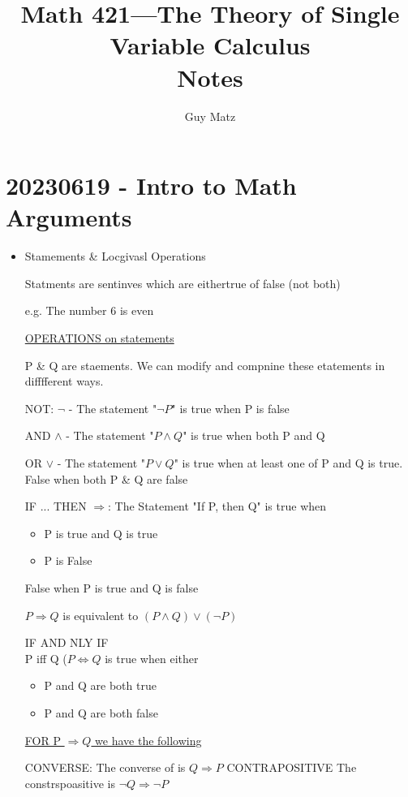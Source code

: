 \documentclass{report}
\title{
  \Huge{Math 421---The Theory of Single Variable Calculus}
  \\
  Notes
}
\author{\huge{Guy Matz}}
\date{}
\begin{document}
\section*{20230619 - Intro to Math Arguments}%
  \begin{itemize}
          \item Stamements \& Locgivasl Operations

            Statments are sentinves which are eithertrue of false (not both)

            e.g. The number 6 is even

            \underline{OPERATIONS on statements}

            P \& Q are staements.  We can modify and compnine these etatements in
            difffferent ways.

            NOT: $\neg$ - The statement "$\neg P$" is true when P is false

            AND $\wedge$ - The statement "$P \wedge Q $" is true when both P and Q

            OR $\vee$ - The statement "$P \vee Q $" is true when at least one of
            P and Q is true.  False when both P \& Q are false

            IF ... THEN $\Longrightarrow $: The Statement "If P, then Q" is true when
            \begin{itemize}
              \item P is true and Q is true
              \item P is False
            \end{itemize}

            False when P is true and Q is false

            $P \Longrightarrow Q$ is equivalent to $(P \wedge Q) \vee (\neg P)$

            IF AND NLY IF\\
            P iff Q ($P \Leftrightarrow Q$ is true when either
           \begin{itemize}
              \item P and Q are both true
              \item P and Q are both false
            \end{itemize}

            \underline{FOR P $\Longrightarrow Q$ we have the following}

            CONVERSE: The converse of is $Q \Longrightarrow P$
            CONTRAPOSITIVE The constrspoasitive is $\neg Q \Longrightarrow \neg P$


\end{itemize}
\end{document}
